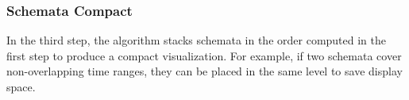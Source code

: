 %	
%

\subsubsection{Schemata Compact}
\label{sub:layout-compact}
In the third step, the algorithm stacks schemata in the order computed in the first step to produce a compact visualization. For example, if two schemata cover non-overlapping time ranges, they can be placed in the same level to save display space. 

